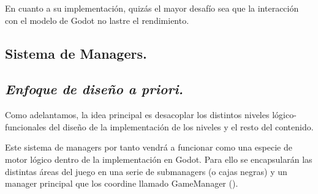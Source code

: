 En cuanto a su implementación, quizás el mayor desafío sea que la interacción con el modelo de Godot no lastre el rendimiento.

\subsection{Sistema de Managers.}\label{modelado:sistema-de-managers}
\subsection*{\noindent\normalfont\textit{Enfoque de diseño a priori.}}

Como adelantamos, la idea principal es desacoplar los distintos niveles lógico-funcionales del diseño de la implementación de los niveles y el resto del contenido.

Este sistema de managers por tanto vendrá a funcionar como una especie de motor lógico dentro de la implementación en Godot. Para ello se encapsularán las distintas áreas del juego en una serie de submanagers (o cajas negras) y un manager principal que los coordine llamado GameManager ().

